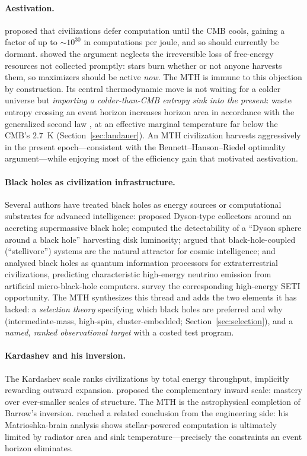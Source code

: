 \documentclass[11pt]{article}
\begin{document}
\paragraph{Aestivation.} \citet{sandberg2016} proposed that civilizations defer computation until the CMB cools, gaining a factor of up to ${\sim}10^{30}$ in computations per joule, and so should currently be dormant. \citet{bennett2019} showed the argument neglects the irreversible loss of free-energy resources not collected promptly: stars burn whether or not anyone harvests them, so maximizers should be active \emph{now}. The MTH is immune to this objection by construction. Its central thermodynamic move is not waiting for a colder universe but \emph{importing a colder-than-CMB entropy sink into the present}: waste entropy crossing an event horizon increases horizon area in accordance with the generalized second law \citep{bekenstein1974}, at an effective marginal temperature far below the CMB's $2.7$~K (Section~\ref{sec:landauer}). An MTH civilization harvests aggressively in the present epoch---consistent with the Bennett--Hanson--Riedel optimality argument---while enjoying most of the efficiency gain that motivated aestivation.

\paragraph{Black holes as civilization infrastructure.} Several authors have treated black holes as energy sources or computational substrates for advanced intelligence: \citet{inoue2011} proposed Dyson-type collectors around an accreting supermassive black hole; \citet{hsiao2021} computed the detectability of a ``Dyson sphere around a black hole'' harvesting disk luminosity; \citet{vidal2011,vidal2014} argued that black-hole-coupled (``stellivore'') systems are the natural attractor for cosmic intelligence; and \citet{dvali2023} analysed black holes as quantum information processors for extraterrestrial civilizations, predicting characteristic high-energy neutrino emission from artificial micro-black-hole computers. \citet{lacki2025} survey the corresponding high-energy SETI opportunity. The MTH synthesizes this thread and adds the two elements it has lacked: a \emph{selection theory} specifying which black holes are preferred and why (intermediate-mass, high-spin, cluster-embedded; Section~\ref{sec:selection}), and a \emph{named, ranked observational target} with a costed test program.

\paragraph{Kardashev and his inversion.} The Kardashev scale \citep{kardashev1964} ranks civilizations by total energy throughput, implicitly rewarding outward expansion. \citet{barrow1998} proposed the complementary inward scale: mastery over ever-smaller scales of structure. The MTH is the astrophysical completion of Barrow's inversion. \citet{bradbury1999} reached a related conclusion from the engineering side: his Matrioshka-brain analysis shows stellar-powered computation is ultimately limited by radiator area and sink temperature---precisely the constraints an event horizon eliminates.
\end{document}

